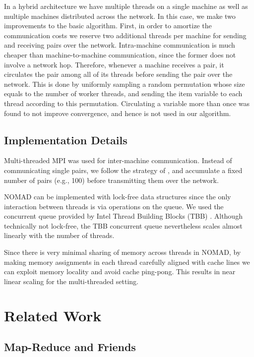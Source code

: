 \documentclass{vldb}
\begin{document}
In a hybrid architecture we have multiple threads on a single machine as
well as multiple machines distributed across the network. In this case,
we make two improvements to the basic algorithm. First, in order to
amortize the communication costs we reserve two additional threads per
machine for sending and receiving  pairs over the
network. Intra-machine communication is much cheaper than
machine-to-machine communication, since the former does not involve a
network hop.  Therefore, whenever a machine receives a 
pair, it circulates the pair among all of its threads before sending the
pair over the network. This is done by uniformly sampling a random
permutation whose size equals to the number of worker threads, and
sending the item variable to each thread according to this
permutation. Circulating a variable more than once was found to not
improve convergence, and hence is not used in our algorithm.



\subsection{Implementation Details}
\label{sec:ImplDeta}

Multi-threaded MPI was used for inter-machine communication. Instead
of communicating single  pairs, we follow the strategy
of \citep{SmoNar10}, and accumulate a fixed number of pairs (e.g.,
100) before transmitting them over the network.


NOMAD can be implemented with lock-free data structures since the only
interaction between threads is via operations on the queue.  We used
the concurrent queue provided by Intel Thread Building Blocks (TBB)
\citep{TBB}. Although technically not lock-free, the TBB concurrent
queue nevertheless scales almost linearly with the number of threads.

Since there is very minimal sharing of memory across threads in NOMAD,
by making memory assignments in each thread carefully aligned with
cache lines we can exploit memory locality and avoid cache
ping-pong. This results in near linear scaling for the multi-threaded
setting.





\section{Related Work}
\label{sec:RelatedWork}

\subsection{Map-Reduce and Friends}
\label{sec:MapReduceFriends}
\end{document}
